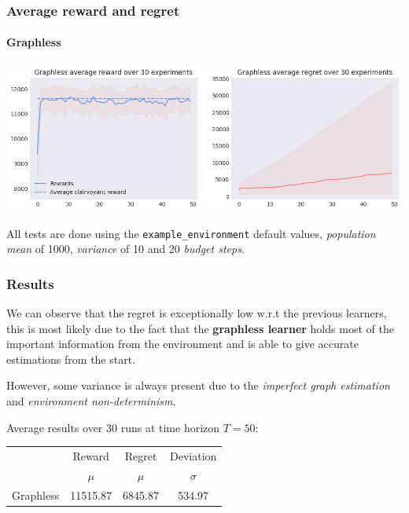 \begin{frame}[plain]

\frametitle{Average reward and regret}
\framesubtitle{Graphless}

\begin{center}
	\includegraphics[scale=0.4]{img/Graphs/graphless/image2.png}
\end{center}

\vspace*{2em}

\scriptsize All tests are done using the \texttt{example\_environment} default values, \textit{population mean} of 1000, \textit{variance} of 10 and 20 \textit{budget steps}.

\end{frame}


\begin{frame}

\frametitle{Results}

We can observe that the regret is exceptionally low w.r.t the previous learners, this is most likely due to the fact that the \textbf{graphless learner} holds most of the important information from the environment and is able to give accurate estimations from the start.

However, some variance is always present due to the \textit{imperfect graph estimation} and \textit{environment non-determinism}.

Average results over 30 runs at time horizon $T = 50$:

\begin{table}
	\begin{tabular}{|c|cc|c|}
	\hline \hline
		\cellcolor{blue!25} & Reward 	& Regret	& Deviation \\
	\cline{2-4}
		\cellcolor{blue!25} & $\mu$		& $\mu$		& $\sigma$	\\
	\hline \hline
		Graphless			& 11515.87 	& 6845.87	& 534.97 	\\
	\hline \hline
	\end{tabular}
\end{table}

\end{frame}

